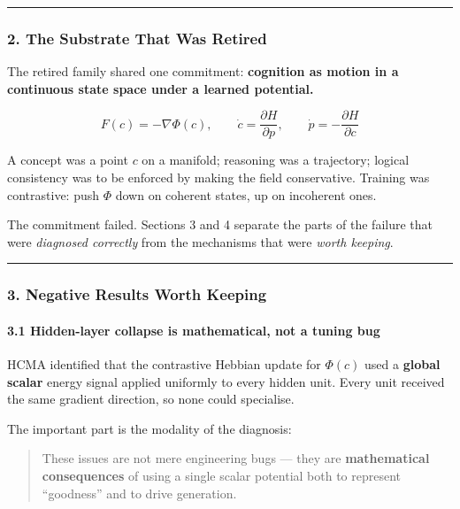 \documentclass[
  11pt,
  a4paper,
]{article}
\begin{document}
\begin{center}\rule{0.5\linewidth}{0.5pt}\end{center}

\subsubsection{2. The Substrate That Was
Retired}\label{the-substrate-that-was-retired}

The retired family shared one commitment: \textbf{cognition as motion in
a continuous state space under a learned potential.}

\[
F(c) = -\nabla \Phi(c), \qquad
\dot{c} = \frac{\partial H}{\partial p}, \qquad
\dot{p} = -\frac{\partial H}{\partial c}
\]

A concept was a point \(c\) on a manifold; reasoning was a trajectory;
logical consistency was to be enforced by making the field conservative.
Training was contrastive: push \(\Phi\) down on coherent states, up on
incoherent ones.

The commitment failed. Sections 3 and 4 separate the parts of the
failure that were \emph{diagnosed correctly} from the mechanisms that
were \emph{worth keeping}.

\begin{center}\rule{0.5\linewidth}{0.5pt}\end{center}

\subsubsection{3. Negative Results Worth
Keeping}\label{negative-results-worth-keeping}

\paragraph{3.1 Hidden-layer collapse is mathematical, not a tuning
bug}\label{hidden-layer-collapse-is-mathematical-not-a-tuning-bug}

HCMA identified that the contrastive Hebbian update for \(\Phi(c)\) used
a \textbf{global scalar} energy signal applied uniformly to every hidden
unit. Every unit received the same gradient direction, so none could
specialise.

The important part is the modality of the diagnosis:

\begin{quote}
These issues are not mere engineering bugs --- they are
\textbf{mathematical consequences} of using a single scalar potential
both to represent ``goodness'' and to drive generation.
\end{quote}
\end{document}
